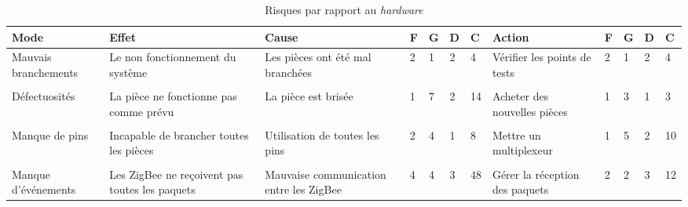 \begin{table}[h]
	\centering
	\caption{Risques par rapport au \emph{hardware}}
	\begin{tabular}{P{2cm}P{2cm}P{2cm}llllP{2cm}llll}
		\hline
		\bf Mode & \bf Effet & \bf Cause & \bf F & \bf G & \bf D & \bf C & \bf Action & \bf F & \bf G & \bf D & \bf C  \\
		\hline
		\hline
		Mauvais branchements & Le non fonctionnement du système & Les pièces ont été mal branchées & 2 & 1 & 2 & 4 & Vérifier les points de tests & 2 & 1 & 2 & 4 \\\\
		Défectuosités & La pièce ne fonctionne pas comme prévu & La pièce est brisée & 1 & 7 & 2 & 14 &	Acheter des nouvelles pièces & 1 & 3 & 1 & 3 \\\\
		Manque de pins & Incapable de brancher toutes les pièces & Utilisation de toutes les pins & 2 & 4 & 1 & 8 & Mettre un multiplexeur & 1 & 5 & 2 & 10 \\\\
        Manque d'événements & Les ZigBee ne reçoivent pas toutes les paquets & Mauvaise communication entre les ZigBee & 4 & 4 & 3 & 48 & Gérer la réception des paquets & 2 & 2 & 3 & 12 \\
		\hline
	\end{tabular}
\end{table}

